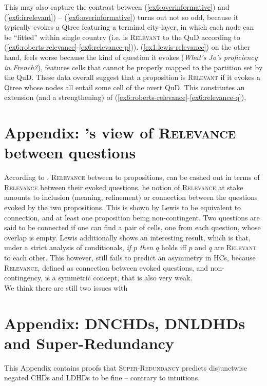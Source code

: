 This may also capture the contrast between (\ref{ex6:overinformative}) and (\ref{ex6:irrelevant}) -- (\ref{ex6:overinformative}) turns out not so odd, because it typically evokes a Qtree featuring a terminal city-layer, in which each node can be ``fitted'' within single country (i.e. is \textsc{Relevant} to the QuD according to (\ref{ex6:roberts-relevance}-\ref{ex6:relevance-p})). (\ref{ex1:lewis-relevance}) on the other hand, feels worse because the kind of question it evokes (\textit{What's Jo's proficiency in French?}), features cells that cannot be properly mapped to the partition set by the QuD. These data overall suggest that a proposition is \textsc{Relevant} if it evokes a Qtree whose nodes all entail some cell of the overt QuD. This constitutes an extension (and a strengthening) of (\ref{ex6:roberts-relevance}-\ref{ex6:relevance-q}), 
\section{Appendix: \citeauthor{Lewis1988}'s view of \textsc{Relevance} between questions}
 According to \citet{Lewis1988}, \textsc{Relevance} between to propositions, can be cashed out in terms of \textsc{Relevance} between their evoked questions. he notion of \textsc{Relevance} at stake amounts to inclusion (meaning, refinement) or connection between the questions evoked by the two propositions. This is shown by Lewis to be equivalent to connection, and at least one proposition being non-contingent. Two questions are said to be connected if one can find a pair of cells, one from each question, whose overlap is empty. Lewis additionally shows an interesting result, which is that, under a strict analysis of conditionals, \textit{if $p$ then $q$} holds iff $p$ and $q$ are \textsc{Relevant} to each other. This however, still fails to predict an asymmetry in HCs, because \textsc{Relevance}, defined as connection between evoked questions, and non-contingency, is a symmetric concept, that is also very weak. \\

We think there are still two issues with 

\section{Appendix: DNCHDs, DNLDHDs and Super-Redundancy}

This Appendix contains proofs that \textsc{Super-Redundancy} predicts disjunctwise negated CHDs and LDHDs to be fine -- contrary to intuitions.

